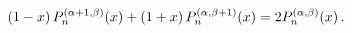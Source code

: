 \[(1-x)\mathop{P^{(\alpha+1,\beta)}_{n}\/}\nolimits\!\left(x\right)+(1+x)\mathop%
{P^{(\alpha,\beta+1)}_{n}\/}\nolimits\!\left(x\right)=2\!\mathop{P^{(\alpha,%
\beta)}_{n}\/}\nolimits\!\left(x\right).\]